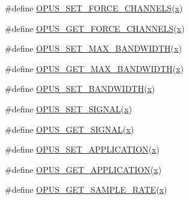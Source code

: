\begin{DoxyCompactItemize}
\item 
\#define \mbox{\hyperlink{group__opus__encoderctls_ga8450a745bd919a8de522afec115f3b5f}{O\+P\+U\+S\+\_\+\+S\+E\+T\+\_\+\+F\+O\+R\+C\+E\+\_\+\+C\+H\+A\+N\+N\+E\+LS}}(\mbox{\hyperlink{_s_d_l__opengl_8h_ad0e63d0edcdbd3d79554076bf309fd47}{x}})
\item 
\#define \mbox{\hyperlink{group__opus__encoderctls_ga21f010167c5dfa1b53f20c46d473e86a}{O\+P\+U\+S\+\_\+\+G\+E\+T\+\_\+\+F\+O\+R\+C\+E\+\_\+\+C\+H\+A\+N\+N\+E\+LS}}(\mbox{\hyperlink{_s_d_l__opengl_8h_ad0e63d0edcdbd3d79554076bf309fd47}{x}})
\item 
\#define \mbox{\hyperlink{group__opus__encoderctls_ga4f88288e89c595c07c61db316cc45289}{O\+P\+U\+S\+\_\+\+S\+E\+T\+\_\+\+M\+A\+X\+\_\+\+B\+A\+N\+D\+W\+I\+D\+TH}}(\mbox{\hyperlink{_s_d_l__opengl_8h_ad0e63d0edcdbd3d79554076bf309fd47}{x}})
\item 
\#define \mbox{\hyperlink{group__opus__encoderctls_gaa3b5736de64792e1144ce12dfb87613c}{O\+P\+U\+S\+\_\+\+G\+E\+T\+\_\+\+M\+A\+X\+\_\+\+B\+A\+N\+D\+W\+I\+D\+TH}}(\mbox{\hyperlink{_s_d_l__opengl_8h_ad0e63d0edcdbd3d79554076bf309fd47}{x}})
\item 
\#define \mbox{\hyperlink{group__opus__encoderctls_ga0178dabe5526d5b0667d81489cc93791}{O\+P\+U\+S\+\_\+\+S\+E\+T\+\_\+\+B\+A\+N\+D\+W\+I\+D\+TH}}(\mbox{\hyperlink{_s_d_l__opengl_8h_ad0e63d0edcdbd3d79554076bf309fd47}{x}})
\item 
\#define \mbox{\hyperlink{group__opus__encoderctls_gaaa87ccee4ae46aa6c9528e03c5122b89}{O\+P\+U\+S\+\_\+\+S\+E\+T\+\_\+\+S\+I\+G\+N\+AL}}(\mbox{\hyperlink{_s_d_l__opengl_8h_ad0e63d0edcdbd3d79554076bf309fd47}{x}})
\item 
\#define \mbox{\hyperlink{group__opus__encoderctls_ga640d434de535e2d2caec991c347303a4}{O\+P\+U\+S\+\_\+\+G\+E\+T\+\_\+\+S\+I\+G\+N\+AL}}(\mbox{\hyperlink{_s_d_l__opengl_8h_ad0e63d0edcdbd3d79554076bf309fd47}{x}})
\item 
\#define \mbox{\hyperlink{group__opus__encoderctls_ga18fa17dae52ff8f3eaea314204bf1a36}{O\+P\+U\+S\+\_\+\+S\+E\+T\+\_\+\+A\+P\+P\+L\+I\+C\+A\+T\+I\+ON}}(\mbox{\hyperlink{_s_d_l__opengl_8h_ad0e63d0edcdbd3d79554076bf309fd47}{x}})
\item 
\#define \mbox{\hyperlink{group__opus__encoderctls_ga062ebbc209caf6832fe4a309a459fd4c}{O\+P\+U\+S\+\_\+\+G\+E\+T\+\_\+\+A\+P\+P\+L\+I\+C\+A\+T\+I\+ON}}(\mbox{\hyperlink{_s_d_l__opengl_8h_ad0e63d0edcdbd3d79554076bf309fd47}{x}})
\item 
\#define \mbox{\hyperlink{group__opus__encoderctls_gac8ad425424211faae6a0fbfb7c28bb51}{O\+P\+U\+S\+\_\+\+G\+E\+T\+\_\+\+S\+A\+M\+P\+L\+E\+\_\+\+R\+A\+TE}}(\mbox{\hyperlink{_s_d_l__opengl_8h_ad0e63d0edcdbd3d79554076bf309fd47}{x}})

\end{DoxyCompactItemize}
